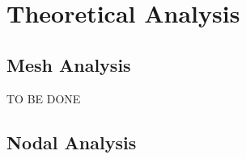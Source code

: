 \newpage
\section{Theoretical Analysis}
\label{sec:analysis}

\subsection{Mesh Analysis}

TO BE DONE

\subsection{Nodal Analysis}
